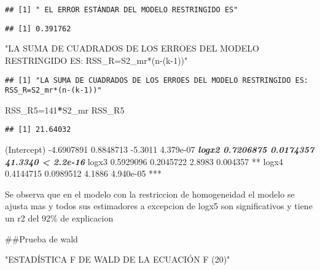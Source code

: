 \documentclass[
]{article}
\newenvironment{Shaded}{\begin{snugshade}}{\end{snugshade}}
\newcommand{\DecValTok}[1]{\textcolor[rgb]{0.00,0.00,0.81}{#1}}
\newcommand{\FloatTok}[1]{\textcolor[rgb]{0.00,0.00,0.81}{#1}}
\newcommand{\NormalTok}[1]{#1}
\newcommand{\OperatorTok}[1]{\textcolor[rgb]{0.81,0.36,0.00}{\textbf{#1}}}
\newcommand{\StringTok}[1]{\textcolor[rgb]{0.31,0.60,0.02}{#1}}
\begin{document}
\begin{verbatim}
## [1] " EL ERROR ESTÁNDAR DEL MODELO RESTRINGIDO ES"
\end{verbatim}

\begin{Shaded}
\end{Shaded}

\begin{verbatim}
## [1] 0.391762
\end{verbatim}

\begin{Shaded}
\begin{Highlighting}[]
\StringTok{"LA SUMA DE CUADRADOS DE LOS ERROES DEL MODELO RESTRINGIDO ES: RSS_R=S2_mr*(n-(k-1))"}
\end{Highlighting}
\end{Shaded}

\begin{verbatim}
## [1] "LA SUMA DE CUADRADOS DE LOS ERROES DEL MODELO RESTRINGIDO ES: RSS_R=S2_mr*(n-(k-1))"
\end{verbatim}

\begin{Shaded}
\begin{Highlighting}[]
\NormalTok{RSS_R5=}\DecValTok{141}\OperatorTok{*}\NormalTok{S2_mr}
\NormalTok{RSS_R5}
\end{Highlighting}
\end{Shaded}

\begin{verbatim}
## [1] 21.64032
\end{verbatim}

(Intercept) -4.6907891 0.8848713 -5.3011 4.379e-07 \textbf{\emph{ logx2
0.7206875 0.0174357 41.3340 \textless{} 2.2e-16 }} logx3 0.5929096
0.2045722 2.8983 0.004357 ** logx4 0.4144715 0.0989512 4.1886 4.940e-05
***

Se observa que en el modelo con la restriccion de homogeneidad el modelo
se ajusta mas y todos sus estimadores a excepcion de logx5 son
significativos y tiene un r2 del 92\% de explicacion

\#\#Prueba de wald

\begin{Shaded}
\begin{Highlighting}[]
\StringTok{"ESTADÍSTICA F DE WALD DE LA ECUACIÓN F (20)"}
\end{Highlighting}
\end{Shaded}
\end{document}
